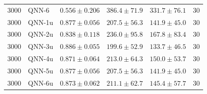 \begin{longtable}{rlrrrr}
3000 & QNN-6 & $0.556 \pm 0.206$ & $386.4 \pm 71.9$ & $331.7 \pm 76.1$ & 30 \\
3000 & QNN-1u & $0.877 \pm 0.056$ & $207.5 \pm 56.3$ & $141.9 \pm 45.0$ & 30 \\
3000 & QNN-2u & $0.838 \pm 0.118$ & $236.0 \pm 95.8$ & $167.8 \pm 83.4$ & 30 \\
3000 & QNN-3u & $0.886 \pm 0.055$ & $199.6 \pm 52.9$ & $133.7 \pm 46.5$ & 30 \\
3000 & QNN-4u & $0.871 \pm 0.064$ & $213.0 \pm 64.3$ & $150.0 \pm 53.7$ & 30 \\
3000 & QNN-5u & $0.877 \pm 0.056$ & $207.5 \pm 56.3$ & $141.9 \pm 45.0$ & 30 \\
3000 & QNN-6u & $0.873 \pm 0.062$ & $211.1 \pm 62.7$ & $145.4 \pm 57.7$ & 30 \\
\end{longtable}
\par{}
